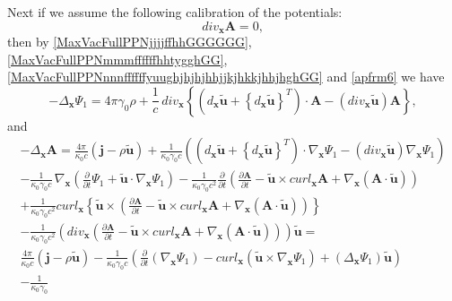 \documentclass{article}
\theoremstyle{definition}
\theoremstyle{remark}
\renewcommand{\vec}[1]{\mathbf{#1}}
\newcommand{\er}{\eqref}
\newcommand{\er}{\eqref}
\begin{document}
Next if we assume the following calibration of the potentials:
\begin{equation}\label{MaxVacFullPPNjjjjffhhGGGGGG}
div_{\vec x}\vec A=0,
\end{equation}
then by \er{MaxVacFullPPNjjjjffhhGGGGGG},
\er{MaxVacFullPPNmmmffffffhhtygghGG},
\er{MaxVacFullPPNnnnffffffyuughjhjhjhhjjkjhkkjhhjhghGG} and
\er{apfrm6} we have
\begin{equation}\label{MaxVacFullPPNmmmffffffhhtygghGGGG}
-\Delta_{\vec x}\Psi_1=4\pi\gamma_0\rho+\frac{1}{c}\,div_{\vec x}
\left\{\left(d_{\vec x}\vec {\tilde u}+\left\{d_{\vec x}\vec {\tilde
u}\right\}^T\right)\cdot\vec A-\left(div_{\vec x}\vec {\tilde
u}\right)\vec A\right\},
\end{equation}
and
\begin{multline}\label{MaxVacFullPPNnnnffffffyuughjhjhjhhjjkjhkkjhhjhghGGGG}
-\Delta_{\vec x}\vec A= \frac{4\pi}{\kappa_0 c}\left(\vec j-\rho\vec
{\tilde u}\right)+\frac{1}{\kappa_0\gamma_0 c}\left(\left(d_{\vec
x}\vec {\tilde u}+\left\{d_{\vec x}\vec {\tilde
u}\right\}^T\right)\cdot \nabla_{\vec x}\Psi_1-\left(div_{\vec
x}\vec {\tilde u}\right)\nabla_{\vec
x}\Psi_1\right)\\-\frac{1}{\kappa_0\gamma_0 c}\,\nabla_{\vec
x}\left(\frac{\partial}{\partial t}\Psi_1+\vec {\tilde
u}\cdot\nabla_{\vec x}\Psi_1\right)-\frac{1}{\kappa_0\gamma_0
c^2}\frac{\partial}{\partial t}\left(\frac{\partial\vec A}{\partial
t}-\vec {\tilde u}\times curl_{\vec x}\vec A+\nabla_{\vec
x}\left(\vec A\cdot\vec {\tilde
u}\right)\right)\\+\frac{1}{\kappa_0\gamma_0 c^2}curl_{\vec x}
\left\{\vec {\tilde u}\times
\left(\frac{\partial\vec A}{\partial t}-\vec {\tilde u}\times
curl_{\vec x}\vec A+\nabla_{\vec x}\left(\vec A\cdot\vec {\tilde
u}\right)\right)\right\}\\-\frac{1}{\kappa_0\gamma_0
c^2}\left(div_{\vec x}\left(\frac{\partial\vec A}{\partial t}-\vec
{\tilde u}\times curl_{\vec x}\vec A+\nabla_{\vec x}\left(\vec
A\cdot\vec {\tilde u}\right)\right)\right)\vec {\tilde u}=
\\
%
%
%
\frac{4\pi}{\kappa_0 c}\left(\vec j-\rho\vec {\tilde
u}\right)-\frac{1}{\kappa_0\gamma_0 c}\left(\frac{\partial}{\partial
t}\left(\nabla_{\vec x}\Psi_1\right)-curl_{\vec x}\left(\vec {\tilde
u}\times\nabla_{\vec x}\Psi_1\right)+\left(\Delta_{\vec
x}\Psi_1\right)\vec {\tilde u}\right)\\-\frac{1}{\kappa_0\gamma_0
}
\end{multline}
\end{document}
